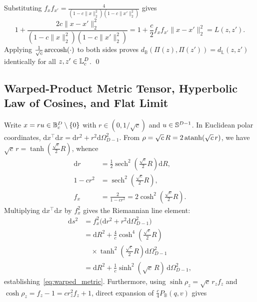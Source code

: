 Substituting $f_x f_{x'} = \frac{4}{(1 - c\|x\|_2^2)(1 - c\|x'\|_2^2)}$ gives
\begin{equation}
  1 + \frac{2c\|x - x'\|_2^2}{(1 - c\|x\|_2^2)(1 - c\|x'\|_2^2)}
  = 1 + \frac{c}{2} f_x f_{x'}\|x - x'\|_2^2
  = L(z, z').
\end{equation}
Applying $\frac{1}{\sqrt{c}}\operatorname{arccosh}(\cdot)$ to both sides proves $d_{\mathbb{B}}(\Pi(z), \Pi(z')) = d_{\mathbb{L}}(z, z')$ identically for all $z, z' \in \mathbb{L}_c^D$. \qed

\subsection{Warped-Product Metric Tensor, Hyperbolic Law of Cosines, and Flat Limit}
Write $x = r u \in \mathbb{B}_c^D \setminus \{0\}$ with $r \in (0, 1/\sqrt{c})$ and $u \in \mathbb{S}^{D-1}$.
In Euclidean polar coordinates, $\mathrm{d}x^\top \mathrm{d}x = \mathrm{d}r^2 + r^2 \mathrm{d}\Omega_{D-1}^2$.
From $\rho = \sqrt{c}\,R = 2\operatorname{atanh}(\sqrt{c}\,r)$, we have $\sqrt{c}\,r = \tanh(\frac{\sqrt{c}}{2}R)$, whence
\begin{equation}
  \begin{aligned}
    \mathrm{d}r &= \frac{1}{2}\operatorname{sech}^2\!\left(\frac{\sqrt{c}}{2}R\right)\mathrm{d}R, \\
    1 - c r^2 &= \operatorname{sech}^2\!\left(\frac{\sqrt{c}}{2}R\right), \\
    f_x &= \frac{2}{1 - c r^2} = 2\cosh^2\!\left(\frac{\sqrt{c}}{2}R\right).
  \end{aligned}
\end{equation}
Multiplying $\mathrm{d}x^\top \mathrm{d}x$ by $f_x^2$ gives the Riemannian line element:
\begin{equation}
  \begin{aligned}
    \mathrm{d}s^2 &= f_x^2\bigl(\mathrm{d}r^2 + r^2\mathrm{d}\Omega_{D-1}^2\bigr) \\
    &= \mathrm{d}R^2 + \frac{4}{c}\cosh^4\!\left(\frac{\sqrt{c}}{2}R\right) \\
    &\quad\times\tanh^2\!\left(\frac{\sqrt{c}}{2}R\right)\mathrm{d}\Omega_{D-1}^2 \\
    &= \mathrm{d}R^2 + \frac{1}{c}\sinh^2(\sqrt{c}\,R)\,\mathrm{d}\Omega_{D-1}^2,
  \end{aligned}
\end{equation}
establishing~\eqref{eq:warped_metric}.
Furthermore, using $\sinh\rho_z = \sqrt{c}\,r_z f_z$ and $\cosh\rho_z = f_z - 1 = c r_z^2 f_z + 1$, direct expansion of $\frac{c}{4}P_{\mathbb{B}}(q, v)$ gives
